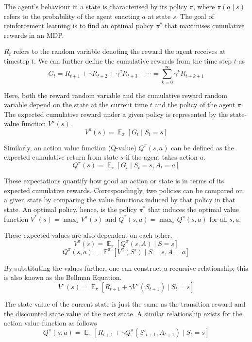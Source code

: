\documentclass[12pt,a4paper]{report}
\DeclareMathOperator{\EX}{\mathbb{E}}
\begin{document}
The agent's behaviour in a state is characterised by its policy $\pi$, where $\pi(a \mid s)$ refers to the probability of the agent enacting $a$ at state $s$. The goal of reinforcement learning is to find an optimal policy $\pi^*$ that maximises cumulative rewards in an MDP. \par

$R_{t}$ refers to the random variable denoting the reward the agent receives at timestep $t$. We can further define the cumulative rewards from the time step $t$ as 
\[G_t = R_{t+1} + \gamma R_{t+2} + \gamma^2 R_{t+3} + \cdots = \sum_{k=0}^{\infty} \gamma^k R_{t+k+1}\] \par

Here, both the reward random variable and the cumulative reward random variable depend on the state at the current time $t$ and the policy of the agent $\pi$. The expected cumulative reward under a given policy is represented by the state-value function $V^{\pi}(s)$.
\[
  V^{\pi}(s) = \EX_{\pi}[G_t \mid S_t = s]
\] \par

Similarly, an action value function (Q-value) $Q^\pi (s, a)$ can be defined as the expected cumulative return from state $s$ if the agent takes action $a$. 
\[
  Q^{\pi}(s) = \EX_{\pi}[G_t \mid S_t = s, A_t = a]
\] \par

These expectations quantify how good an action or state is in terms of its expected cumulative rewards. Correspondingly, two policies can be compared on a given state by comparing the value functions induced by that policy in that state. An optimal policy, hence, is the policy $\pi^*$ that induces the optimal value function $V^*(s) = \max_\pi V^\pi(s)$ and $Q^*(s, a) = \max_\pi Q^\pi(s, a)$ for all $s, a$. \par

These expected values are also dependent on each other.
\[
  V^\pi(s) = \EX_{\pi}[Q^\pi(s, A) \mid S = s]
\]
\[
  Q^\pi(s, a) = \EX^\pi[V^\pi(S') \mid S = s, A = a ]
\] \par

By substituting the values further, one can construct a recursive relationship; this is also known as the Bellman Equation.  
\[
  V^\pi(s) = \EX_{\pi}[ R_{t+1} + \gamma V^\pi(S_{t+1}) \mid S_{t}= s]
\] \par

The state value of the current state is just the same as the transition reward and the discounted state value of the next state. A similar relationship exists for the action value function as follows  
\[
  Q^\pi(s, a) = \EX_{\pi}[ R_{t+1} + \gamma Q^\pi(S'_{t+1}, A_{t+1}) \mid S_{t}= s]
\] \par
\end{document}
